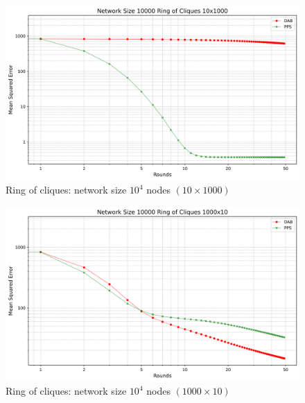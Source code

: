 \begin{figure}[H]
    \centering
    \includegraphics[scale=0.5]{figures/ringOfCliquesSimulations/10x1000/DAB_vs_PPS_RoC_r50_n10000.png}
    \caption{Ring of cliques: network size $10^{4}$ nodes $(10 \times 1000)$}
    \label{fig:10x1000RingOfCliques}
\end{figure}\begin{figure}[H]
    \centering
    \includegraphics[scale=0.5]{figures/ringOfCliquesSimulations/1000x10/DAB_vs_PPS_RoC_r50_n10000.png}
    \caption{Ring of cliques: network size $10^{4}$ nodes $(1000 \times 10)$}
    \label{fig:1000x10RingOfCliques}
\end{figure}

